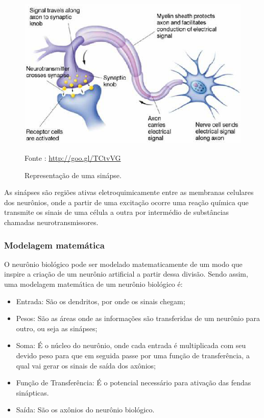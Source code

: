     \begin{figure}[ht]
        \centering
        \label{fig02}
            \includegraphics[keepaspectratio=true, scale=0.4]{editaveis/images/sinapse.eps}
        \caption{Representação de uma sinápse.}
        Fonte : \url{http://goo.gl/TCtvVG}
    \end{figure}

    As sinápses são regiões ativas eletroquimicamente entre as membranas celulares dos neurônios, onde a partir de uma excitação ocorre uma reação química que transmite os sinais de uma célula a outra por intermédio de substâncias chamadas neurotransmissores.

\subsubsection{Modelagem matemática}
    O neurônio biológico pode ser modelado matematicamente de um modo que inspire a criação de um neurônio artificial a partir dessa divisão. Sendo assim, uma modelagem matemática de um neurônio biológico é: \cite{rocha2006}

    \begin{itemize}
        \item Entrada: São os dendritos, por onde os sinais chegam;
        \item Pesos: São as áreas onde as informações são transferidas de um neurônio para outro,  ou seja as sinápses;
        \item Soma: É o núcleo do neurônio, onde cada entrada é multiplicada com seu devido peso para que em seguida passe por uma função de transferência, a qual vai gerar os sinais de saída dos axônios;
        \item Função de Transferência: É o potencial necessário para ativação das fendas sinápticas.
        \item Saída: São os axônios do neurônio biológico.
    \end{itemize}


